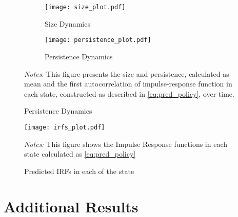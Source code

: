 \documentclass[12pt]{article}
\numberwithin{equation}{section}
\begin{document}
\begin{figure}[!htbp]\centering
  \caption{Size and Persistence Dynamics}
  \vspace{2ex}
  \label{fig:Size_Persistence_Dynamics}
  \begin{subfigure}[b]{0.495\textwidth}
      \centering
      \caption{Size Dynamics}
      \label{fig:AverageResponce}
      \texttt{[image: size\_plot.pdf]}
  \end{subfigure}
  \hfill
  \begin{subfigure}[b]{0.495\textwidth}
      \centering
      \caption{Persistence Dynamics}
      \label{fig:DifferentialResponce}
      \texttt{[image: persistence\_plot.pdf]}
  \end{subfigure}
      {\begin{flushleft}\scriptsize\textit{Notes}: This figure presents the size and persistence, calculated as mean and the first autocorrelation of impulse-response function in each state, constructed as described in \vref{eq:pred_policy}, over time. \end{flushleft}}
\end{figure}


\begin{figure}[!htbp]\centering
  \begin{minipage}{0.8\textwidth}
    \caption{Predicted IRFs in each of the state} 
    \label{fig:predicted_IRF}
    \texttt{[image: irfs\_plot.pdf]}
    {\begin{flushleft}
      \scriptsize \textit{Notes:} This figure shows the Impulse Response functions in each state calculated as \vref{eq:pred_policy}
    \end{flushleft}} 
    \end{minipage}

\end{figure}




\newpage
{}
\newpage
\appendix
{}

\section{Additional Results}
\end{document}
